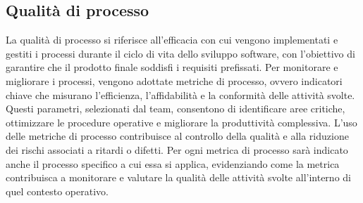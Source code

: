\subsection{Qualità di processo}
La qualità di processo si riferisce all'efficacia con cui vengono implementati e gestiti i processi durante il ciclo di vita dello sviluppo software, 
con l'obiettivo di garantire che il prodotto finale soddisfi i requisiti prefissati. 
Per monitorare e migliorare i processi, vengono adottate metriche di processo, ovvero indicatori chiave che misurano l'efficienza, l'affidabilità 
e la conformità delle attività svolte. 
Questi parametri, selezionati dal team, consentono di identificare aree critiche, ottimizzare le procedure operative e migliorare la produttività complessiva. 
L'uso delle metriche di processo contribuisce al controllo della qualità e alla riduzione dei rischi associati a ritardi o difetti.
Per ogni metrica di processo sarà indicato anche il processo specifico a cui essa si applica, evidenziando come la metrica contribuisca a monitorare 
e valutare la qualità delle attività svolte all'interno di quel contesto operativo.